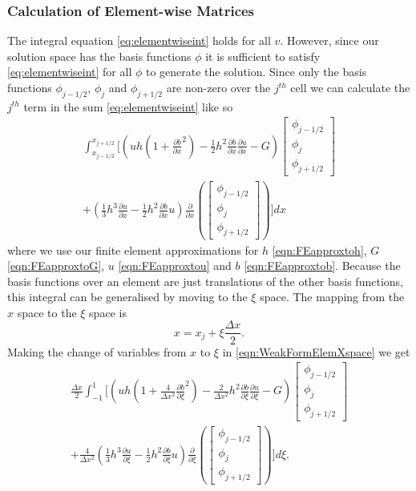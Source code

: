 \subsubsection{Calculation of Element-wise Matrices}
The integral equation \eqref{eq:elementwiseint} holds for all $v$. However, since our solution space has the basis functions $\phi$ it is sufficient to satisfy \eqref{eq:elementwiseint} for all $\phi$ to generate the solution. Since only the basis functions $\phi_{j-1/2}$, $\phi_{j}$ and $\phi_{j+1/2}$ are non-zero over the $j^{th}$ cell we can calculate the $j^{th}$ term in the sum \eqref{eq:elementwiseint} like so
\begin{multline}
\int_{x_{j-1/2} }^{{x_{j+1/2}}} \Bigg[  \left( uh \left(1 + \frac{\partial b}{\partial x}^2 \right)  - \frac{1}{2}h^2\frac{\partial b}{\partial x}  \frac{\partial u }{\partial x}  -  G \right) \begin{bmatrix}
\phi_{j-1/2}\\\phi_j \\\phi_{j+1/2}
\end{bmatrix}   \\ +  \left( \frac{1}{3}h^3  \frac{\partial {u}}{\partial x}    -     \frac{1}{2}h^2\frac{\partial b}{\partial x} u    \right) \frac{\partial}{\partial x}\left(\begin{bmatrix}
\phi_{j-1/2}\\\phi_j \\\phi_{j+1/2}
\end{bmatrix} \right) \Bigg]dx
\label{eqn:WeakFormElemXspace}
\end{multline}
where we use our finite element approximations for $h$ \eqref{eqn:FEapproxtoh}, $G$ \eqref{eqn:FEapproxtoG}, $u$ \eqref{eqn:FEapproxtou} and $b$ \eqref{eqn:FEapproxtob}. Because the basis functions over an element are just translations of the other basis functions, this integral can be generalised by moving to the $\xi$ space. The mapping from the $x$ space to the $\xi$ space is
\begin{equation*}
x = x_j + \xi \frac{\Delta x}{2}.
\end{equation*}
Making the change of variables from $x$ to $\xi$ in \eqref{eqn:WeakFormElemXspace} we get
\begin{multline*}
\frac{\Delta x}{2}\int_{-1 }^{1} \Bigg[  \left( uh \left(1 + \frac{4}{\Delta x^2}\frac{\partial b}{\partial \xi}^2 \right)  - \frac{2}{\Delta x^2} h^2 \frac{\partial b}{\partial \xi}  \frac{\partial u }{\partial \xi}  -  G \right) \begin{bmatrix}
\phi_{j-1/2}\\\phi_j \\\phi_{j+1/2}
\end{bmatrix}   \\ + \frac{4}{\Delta x^2} \left( \frac{1}{3}h^3 \frac{\partial {u}}{\partial \xi}    -     \frac{1}{2}h^2 \frac{\partial b}{\partial \xi} u    \right) \frac{\partial}{\partial \xi}\left(\begin{bmatrix}
\phi_{j-1/2}\\\phi_j \\\phi_{j+1/2}
\end{bmatrix} \right) \Bigg]d\xi.
\end{multline*}


